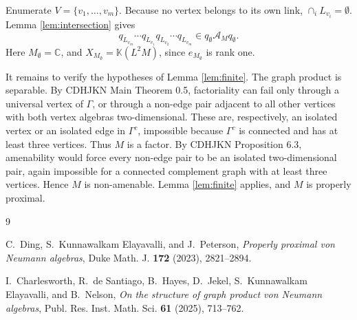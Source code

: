 \documentclass[12pt]{article}
\newcommand{\cA}{\mathcal A}
\newcommand{\C}{\mathbb C}
\begin{document}
Enumerate \(V=\{v_1,\ldots,v_m\}\).  Because no vertex belongs to its own link,
\(\cap_iL_{v_i}=\emptyset\).  Lemma \ref{lem:intersection} gives
\[
 q_{L_{v_m}}\cdots q_{L_{v_1}}q_{L_{v_2}}\cdots q_{L_{v_m}}
 \in q_{\emptyset}\cA_Mq_{\emptyset}.
\]
Here \(M_\emptyset=\C\), and \(X_{M_\emptyset}=\mathbb K(L^2M)\), since
\(e_{M_\emptyset}\) is rank one.

It remains to verify the hypotheses of Lemma \ref{lem:finite}.  The graph
product is separable.  By CDHJKN Main Theorem 0.5, factoriality can fail only
through a universal vertex of \(\Gamma\), or through a non-edge pair adjacent to
all other vertices with both vertex algebras two-dimensional.  These are,
respectively, an isolated vertex or an isolated edge in \(\Gamma^c\), impossible
because \(\Gamma^c\) is connected and has at least three vertices.  Thus \(M\)
is a factor.  By CDHJKN Proposition 6.3, amenability would force every non-edge
pair to be an isolated two-dimensional pair, again impossible for a connected
complement graph with at least three vertices.  Hence \(M\) is non-amenable.
Lemma \ref{lem:finite} applies, and \(M\) is properly proximal.

\begin{thebibliography}{9}

C.~Ding, S.~Kunnawalkam Elayavalli, and J.~Peterson,
\emph{Properly proximal von Neumann algebras},
Duke Math. J. \textbf{172} (2023), 2821--2894.

I.~Charlesworth, R.~de Santiago, B.~Hayes, D.~Jekel,
S.~Kunnawalkam Elayavalli, and B.~Nelson,
\emph{On the structure of graph product von Neumann algebras},
Publ. Res. Inst. Math. Sci. \textbf{61} (2025), 713--762.

\end{thebibliography}
\end{document}
